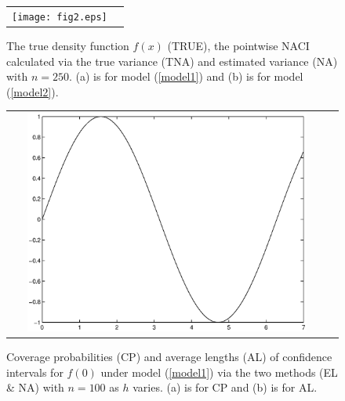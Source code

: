 \documentclass[12pt]{article}
\renewcommand{\baselinestretch}{1.25}
\def\vv{1.3}
\begin{document}
\renewcommand{\baselinestretch}{\vv}

\begin{figure}[htbp]
\begin{tabular}{cc}
\texttt{[image: fig2.eps]}  %
\end{tabular}
\caption{ The true density function $f(x)$ (TRUE),
the pointwise NACI calculated via the true variance (TNA) and estimated variance (NA) with $n=250$. (a) is for model (\ref{model1}) and (b) is for model (\ref{model2}). }
    \label{fig2}
\end{figure}

\renewcommand{\baselinestretch}{\vv}


\begin{figure}[htbp]
\begin{tabular}{cc}
\includegraphics[width=0.90\textwidth]{fig1.eps}  %
\end{tabular}
\caption{ Coverage probabilities (CP) and average lengths (AL) of confidence intervals for  $f(0)$ under model (\ref{model1})  via the two methods (EL \& NA) with $n=100$ as $h$ varies. (a) is for CP and (b) is for AL.   }
    \label{fig3}
\end{figure}



\end{document}
